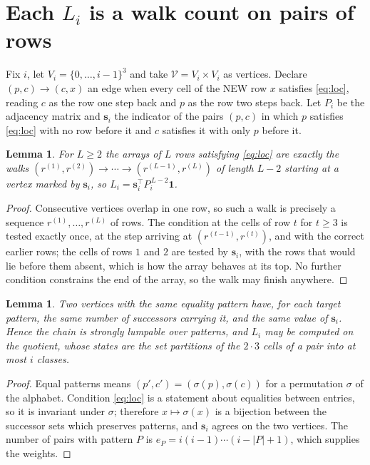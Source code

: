 \documentclass[11pt,a4paper]{article}
\theoremstyle{plain}
\newtheorem{lemma}[theorem]{Lemma}
\theoremstyle{definition}
\begin{document}
\section{Each $L_i$ is a walk count on pairs of rows}

Fix $i$, let $V_i=\{0,\dots,i-1\}^{3}$ and take $\mathcal V=V_i\times V_i$ as vertices.
Declare $(p,c)\to(c,x)$ an edge when every cell of the NEW row $x$ satisfies
\eqref{eq:loc}, reading $c$ as the row one step back and $p$ as the row two steps
back. Let $P_i$ be the adjacency matrix and $\mathbf{s}_i$ the indicator of the pairs
$(p,c)$ in which $p$ satisfies \eqref{eq:loc} with no row before it and $c$ satisfies it
with only $p$ before it.

\begin{lemma}\label{lem:walk}
For $L\ge2$ the arrays of $L$ rows satisfying \eqref{eq:loc} are exactly the walks
$(r^{(1)},r^{(2)})\to\cdots\to(r^{(L-1)},r^{(L)})$ of length $L-2$ starting at a
vertex marked by $\mathbf{s}_i$, so
$L_i=\mathbf{s}_i^{\!\top}P_i^{\,L-2}\mathbf{1}$.
\end{lemma}

\begin{proof}
Consecutive vertices overlap in one row, so such a walk is precisely a sequence
$r^{(1)},\dots,r^{(L)}$ of rows. The condition at the cells of row $t$ for $t\ge3$
is tested exactly once, at the step arriving at $(r^{(t-1)},r^{(t)})$, and with the
correct earlier rows; the cells of rows $1$ and $2$ are tested by $\mathbf{s}_i$, with
the rows that would lie before them absent, which is how the array behaves at its top. No
further condition constrains the end of the array, so the walk may finish anywhere.
\end{proof}

\begin{lemma}\label{lem:lump}
Two vertices with the same equality pattern have, for each target pattern, the same number of
successors carrying it, and the same value of $\mathbf{s}_i$. Hence the chain is strongly
lumpable over patterns, and $L_i$ may be computed on the quotient, whose states are the set
partitions of the $2\cdot3$ cells of a pair into at most $i$ classes.
\end{lemma}

\begin{proof}
Equal patterns means $(p',c')=(\sigma(p),\sigma(c))$ for a permutation $\sigma$ of the
alphabet. Condition \eqref{eq:loc} is a statement about equalities between entries, so it is
invariant under $\sigma$; therefore $x\mapsto\sigma(x)$ is a bijection between the successor
sets which preserves patterns, and $\mathbf{s}_i$ agrees on the two vertices. The number of
pairs with pattern $P$ is $e_P=i(i-1)\cdots(i-|P|+1)$, which supplies the weights.
\end{proof}
\end{document}
